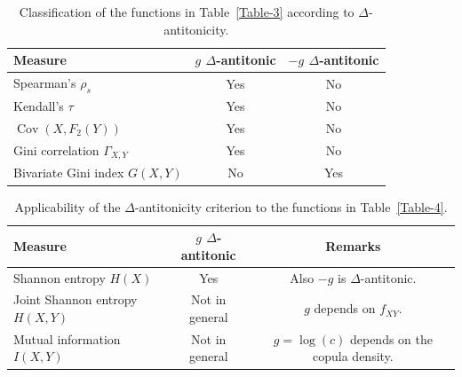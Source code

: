 \documentclass[12pt]{article}
\begin{document}
\begin{table}[H]
	\centering
	\caption{Classification of the functions in Table~\ref{Table-3} according to $\Delta$-antitonicity.}
	\renewcommand{\arraystretch}{1.2}
	\begin{tabular}{lcc}
		\hline
		Measure &
		$g$ $\Delta$-antitonic &
		$-g$ $\Delta$-antitonic
		\\
		\hline
		
		Spearman's $\rho_s$
		&
		Yes
		&
		No
		\\
		
		Kendall's $\tau$
		&
		Yes
		&
		No
		\\
		
		$\operatorname{Cov}(X,F_2(Y))$
		&
		Yes
		&
		No
		\\
		
		Gini correlation $\Gamma_{X,Y}$
		&
		Yes
		&
		No
		\\
		
		Bivariate Gini index $G(X,Y)$
		&
		No
		&
		Yes
		\\
		
		\hline
	\end{tabular}
	\label{tab:Delta-antitonic-Table3}
\end{table}

\begin{table}[H]
	\centering
	\caption{Applicability of the $\Delta$-antitonicity criterion to the functions in Table~\ref{Table-4}.}
	\renewcommand{\arraystretch}{1.2}
	\begin{tabular}{lcc}
		\hline
		Measure &
		$g$ $\Delta$-antitonic &
		Remarks
		\\
		\hline
		Shannon entropy $H(X)$
		&
		Yes
		&
		Also $-g$ is $\Delta$-antitonic.
		\\
		Joint Shannon entropy $H(X,Y)$
		&
		Not in general
		&
		$g$ depends on $f_{XY}$.
		\\
		Mutual information $I(X,Y)$
		&
		Not in general
		&
		$g=\log(c)$ depends on the copula density.
		\\
		\hline
	\end{tabular}
\end{table}
\end{document}
